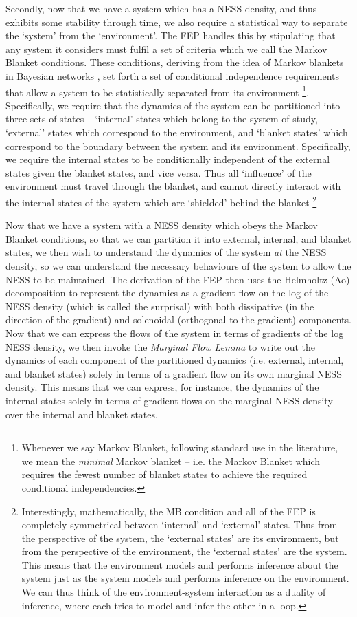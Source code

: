 Secondly, now that we have a system which has a NESS density, and thus exhibits some stability through time, we also require a statistical way to separate the `system' from the `environment'. The FEP handles this by stipulating that any system it considers must fulfil a set of criteria which we call the Markov Blanket conditions. These conditions, deriving from the idea of Markov blankets in Bayesian networks \citep{pearl2011Bayesian,pearl2014probabilistic}, set forth a set of conditional independence requirements that allow a system to be statistically separated from its environment \footnote{Whenever we say Markov Blanket, following standard use in the literature, we mean the \emph{minimal} Markov blanket -- i.e. the Markov Blanket which requires the fewest number of blanket states to achieve the required conditional independencies.}. Specifically, we require that the dynamics of the system can be partitioned into three sets of states -- `internal' states which belong to the system of study, `external' states which correspond to the environment, and `blanket states' which correspond to the boundary between the system and its environment. Specifically, we require the internal states to be conditionally independent of the external states given the blanket states, and vice versa. Thus all `influence' of the environment must travel through the blanket, and cannot directly interact with the internal states of the system which are `shielded' behind the blanket \footnote{Interestingly, mathematically, the MB condition and all of the FEP is completely symmetrical between `internal' and `external' states. Thus from the perspective of the system, the `external states' are its environment, but from the perspective of the environment, the `external states' are the system. This means that the environment models and performs inference about the system just as the system models and performs inference on the environment. We can thus think of the environment-system interaction as a duality of inference, where each tries to model and infer the other in a loop.}

Now that we have a system with a NESS density which obeys the Markov Blanket conditions, so that we can partition it into external, internal, and blanket states, we then wish to understand the dynamics of the system \emph{at} the NESS density, so we can understand the necessary behaviours of the system to allow the NESS to be maintained. The derivation of the FEP then uses the Helmholtz (Ao) decomposition \citep{yuan2017sde,yuan2011potential,yuan2012beyond} to represent the dynamics as a gradient flow on the log of the NESS density (which is called the surprisal) with both dissipative (in the direction of the gradient) and solenoidal (orthogonal to the gradient) components. Now that we can express the flows of the system in terms of gradients of the log NESS density, we then invoke the \emph{Marginal Flow Lemma} to write out the dynamics of each component of the partitioned dynamics (i.e. external, internal, and blanket states) solely in terms of a gradient flow on its own marginal NESS density. This means that we can express, for instance, the dynamics of the internal states solely in terms of gradient flows on the marginal NESS density over the internal and blanket states.

